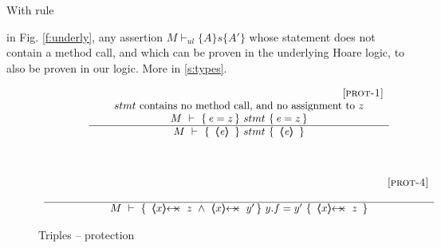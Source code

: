 With rule {{} in Fig. \ref{f:underly},  any assertion $M \vdash_{ul} \{ A \} s \{ A' \}$  whose statement does not contain a method call, and which 
can be proven in the underlying Hoare logic, to also be proven in our logic. More in \ref{s:types}.
 

\begin{figure}[tht]
$
\begin{array}{c}
	{{\inferruleSD{\hspace{2.3cm} [\sc{prot-1}]}
	{   stmt \ \mbox{contains no method call, and no assignment to $z$}
	\\
	{\hproves{M}  {\re = z} {\ stmt\ }{ \re=z} }
	}
	{\hproves{M} 
						{\  \inside{\re}  \ }
						{\  stmt \ }
						{\  \inside{\re}\ }
	}
}}
\\
\\
%
\\
\\
        {\inferruleSD{\hspace{5.3cm} [\sc{prot-4}]}
	{ }
	{\hproves{M} 
						{\ \protectedFrom{x}{z} \ \wedge \   \protectedFrom{x}{y'} }
						{\ y.f=y'\ }
						{\ \protectedFrom{x}{z} \ }
	}
}	 
\end{array}
 $
\caption{Triples -- protection}
\label{f:protection}
\end{figure}







}
